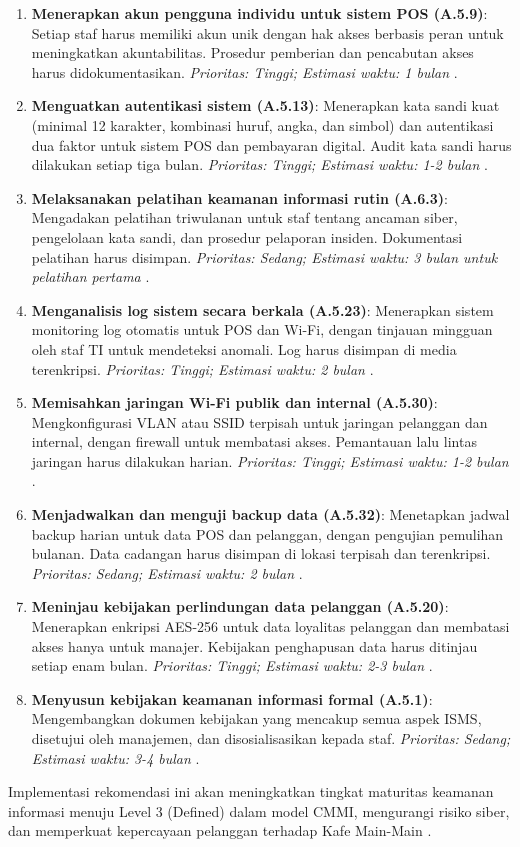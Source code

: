\documentclass[12pt, a4paper]{report}
\begin{document}
\begin{enumerate}
    \item \textbf{Menerapkan akun pengguna individu untuk sistem POS (A.5.9)}: Setiap staf harus memiliki akun unik dengan hak akses berbasis peran untuk meningkatkan akuntabilitas. Prosedur pemberian dan pencabutan akses harus didokumentasikan. \textit{Prioritas: Tinggi; Estimasi waktu: 1 bulan} \citep{widodo2022keamanan}.
    \item \textbf{Menguatkan autentikasi sistem (A.5.13)}: Menerapkan kata sandi kuat (minimal 12 karakter, kombinasi huruf, angka, dan simbol) dan autentikasi dua faktor untuk sistem POS dan pembayaran digital. Audit kata sandi harus dilakukan setiap tiga bulan. \textit{Prioritas: Tinggi; Estimasi waktu: 1-2 bulan} \citep{frangky2024implementasi}.
    \item \textbf{Melaksanakan pelatihan keamanan informasi rutin (A.6.3)}: Mengadakan pelatihan triwulanan untuk staf tentang ancaman siber, pengelolaan kata sandi, dan prosedur pelaporan insiden. Dokumentasi pelatihan harus disimpan. \textit{Prioritas: Sedang; Estimasi waktu: 3 bulan untuk pelatihan pertama} \citep{iso27001}.
    \item \textbf{Menganalisis log sistem secara berkala (A.5.23)}: Menerapkan sistem monitoring log otomatis untuk POS dan Wi-Fi, dengan tinjauan mingguan oleh staf TI untuk mendeteksi anomali. Log harus disimpan di media terenkripsi. \textit{Prioritas: Tinggi; Estimasi waktu: 2 bulan} \citep{sari2023backup}.
    \item \textbf{Memisahkan jaringan Wi-Fi publik dan internal (A.5.30)}: Mengkonfigurasi VLAN atau SSID terpisah untuk jaringan pelanggan dan internal, dengan firewall untuk membatasi akses. Pemantauan lalu lintas jaringan harus dilakukan harian. \textit{Prioritas: Tinggi; Estimasi waktu: 1-2 bulan} \citep{haryanto2021wifi}.
    \item \textbf{Menjadwalkan dan menguji backup data (A.5.32)}: Menetapkan jadwal backup harian untuk data POS dan pelanggan, dengan pengujian pemulihan bulanan. Data cadangan harus disimpan di lokasi terpisah dan terenkripsi. \textit{Prioritas: Sedang; Estimasi waktu: 2 bulan} \citep{sari2023backup}.
    \item \textbf{Meninjau kebijakan perlindungan data pelanggan (A.5.20)}: Menerapkan enkripsi AES-256 untuk data loyalitas pelanggan dan membatasi akses hanya untuk manajer. Kebijakan penghapusan data harus ditinjau setiap enam bulan. \textit{Prioritas: Tinggi; Estimasi waktu: 2-3 bulan} \citep{ratnasari2021pelindungan}.
    \item \textbf{Menyusun kebijakan keamanan informasi formal (A.5.1)}: Mengembangkan dokumen kebijakan yang mencakup semua aspek ISMS, disetujui oleh manajemen, dan disosialisasikan kepada staf. \textit{Prioritas: Sedang; Estimasi waktu: 3-4 bulan} \citep{rokhman2018implementasi}.
\end{enumerate}
Implementasi rekomendasi ini akan meningkatkan tingkat maturitas keamanan informasi menuju Level 3 (Defined) dalam model CMMI, mengurangi risiko siber, dan memperkuat kepercayaan pelanggan terhadap Kafe Main-Main \citep{cmmi, nijamaliza2018adaptable}.
\end{document}
